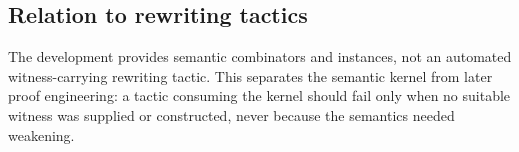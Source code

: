 \subsection{Relation to rewriting tactics}
The development provides semantic combinators and instances, not an automated witness-carrying rewriting tactic. This separates the semantic kernel from later proof engineering: a tactic consuming the kernel should fail only when no suitable witness was supplied or constructed, never because the semantics needed weakening.
